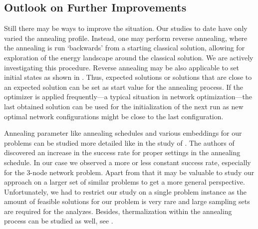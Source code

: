 \documentclass[utf8, nocrop]{FrontiersinHarvardArxiv}
\begin{document}
\subsection{Outlook on Further Improvements}
Still there may be ways to improve the situation.  
Our studies to date have only varied the annealing profile.
Instead, one may perform reverse annealing, where the annealing is run `backwards' from a starting classical solution, allowing for exploration of the energy landscape around the classical solution.  
We are actively investigating this procedure. Reverse annealing may be also applicable to set initial states as shown in \cite{rev_anneal}. Thus, expected solutions or solutions that are close to an expected solution can be set as start value for the annealing process. If the optimizer is applied frequently---a typical situation in network optimization---the last obtained solution can be used for the initialization of the next run as new optimal network configurations might be close to the last configuration.

Annealing parameter like annealing schedules and various embeddings for our problems can be studied more detailed like in the study of \cite{Willsch_2022}. The authors of \cite{Willsch_2022} discovered an increase in the success rate for proper settings in the annealing schedule. In our case we observed a more or less constant success rate, especially for the 3-node network problem. Apart from that it may be valuable to study our approach on a larger set of similar problems to get a more general perspective. Unfortunately, we had to restrict our study on a single problem instance as the amount of feasible solutions for our problem is very rare and large sampling sets are required for the analyzes. Besides, thermalization within the annealing process can be studied as well, see \cite{term_annealing_2013}.
	
\end{document}

